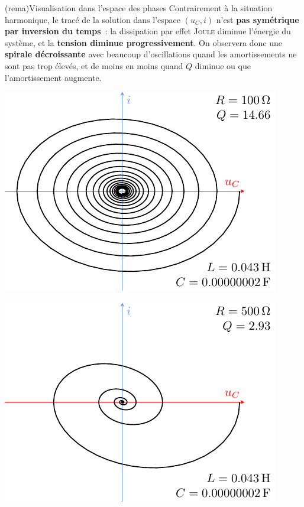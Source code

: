 \documentclass[../../main/main.tex]{subfiles}
\begin{document}
\begin{tcb}[breakable](rema){Visualisation dans l'espace des phases}
	Contrairement à la situation harmonique, le tracé de la solution dans
	l'espace $(u_C,i)$ n'est \textbf{pas symétrique par inversion du temps}~: la
	dissipation par effet \textsc{Joule} diminue l'énergie du système, et la
	\textbf{tension diminue progressivement}.
	\bigbreak
	On observera donc une \textbf{spirale décroissante} avec beaucoup
	d'oscillations quand les amortissements ne sont pas trop élevés, et de moins
	en moins quand $Q$ diminue ou que l'amortissement augmente.
	\tcblower
	\noindent
	\begin{minipage}{0.49\linewidth}
		\begin{center}
			\includegraphics[width=.7\linewidth]{carac-rlc_xy-15}
		\end{center}
	\end{minipage}
	\begin{minipage}{0.49\linewidth}
		\begin{center}
			\includegraphics[width=.7\linewidth]{carac-rlc_xy-3}
		\end{center}
	\end{minipage}
\end{tcb}
\end{document}
